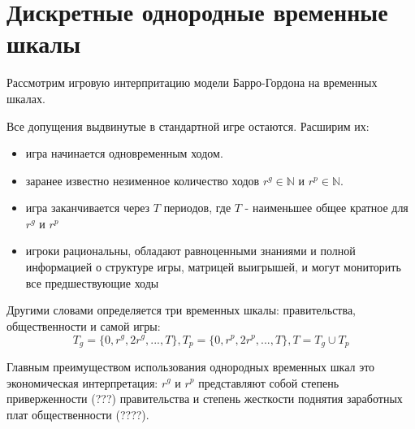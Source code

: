 
\section{Дискретные однородные временные шкалы} 

Рассмотрим игровую интерпритацию модели Барро-Гордона на временных шкалах.

Все допущения выдвинутые в стандартной игре остаются. Расширим их:
\begin{itemize}
\item игра начинается одновременным ходом. 
\item заранее известно незименное количество ходов $r^g \in \mathbb{N}$ и $r^p \in \mathbb{N}$.
\item игра заканчивается через $T$ периодов, где $T$ - наименьшее общее кратное для $r^g$ и $r^p$
\item игроки рациональны, обладают равноценными знаниями и полной информацией о структуре игры, матрицей выигрышей, и могут мониторить все предшествующие ходы
 \end{itemize}

Другими словами определяется три временных шкалы: правительства, общественности и самой игры:
\begin{equation}
\label{eq:sec:tech:scales}
T_g = \{0,r^g,2r^g,...,T\}, T_p=\{0,r^p,2r^p,...,T\}, T=T_g\cup T_p 
\end{equation}

Главным преимуществом использования однородных временных шкал это экономическая интерпретация: $r^g$ и $r^p$ представляют собой степень приверженности (???) правительства и степень жесткости поднятия заработных плат общественности (????).
